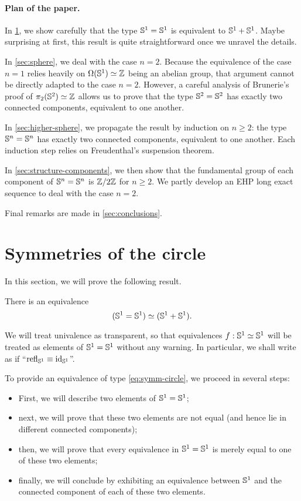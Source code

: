 \documentclass[english,a4paper]{lmcs}
\begin{document}
\paragraph{Plan of the paper.}
In \cref{sec:circle-case}, we show carefully that the type ${{\mathbb S^{1}}} = {{\mathbb S^{1}}}$
is equivalent to ${{\mathbb S^{1}}} + {{\mathbb S^{1}}}$. Maybe surprising at first, this result
is quite straightforward once we unravel the details.

In \cref{sec:sphere}, we deal with the case $n=2$. Because the
equivalence of the case $n=1$ relies heavily on $\Omega({{\mathbb S^{1}}})\simeq \mathbb{Z}$
being an abelian group, that argument cannot be directly adapted to the case
$n=2$. However, a careful analysis of Brunerie's proof of
$\pi_2({{\mathbb S^{2}}}) \simeq \mathbb{Z}$ \cite{TODO} allows us to prove that the type ${{\mathbb S^{2}}}={{\mathbb S^{2}}}$ has
exactly two connected components, equivalent to one another.

In \cref{sec:higher-sphere}, we propagate the result by induction on
$n\geq 2$: the type ${\mathbb S^{n}} = {\mathbb S^{n}}$ has exactly two connected
components, equivalent to one another. Each induction step relies on
Freudenthal's suspension theorem.


In \cref{sec:structure-components}, we then show that the fundamental group
of each component of ${\mathbb S^{n}} = {\mathbb S^{n}}$ is $\mathbb{Z}/2\mathbb{Z}$ for $n\ge2$.
We partly develop an EHP long exact sequence to deal with the case $n=2$.

Final remarks are made in \cref{sec:conclusions}.

\section{Symmetries of the circle}
\label{sec:circle-case}%

In this section, we will prove the following result.
\begin{thm}
  \label{thm:symmetries-of-S1}
  There is an equivalence
  \begin{equation}
    \label{eq:symm-circle}%
    (\Sc = \Sc) \weq (\Sc+\Sc).
  \end{equation}
\end{thm}
We will treat univalence as transparent, so that equivalences
$f:{{\mathbb S^{1}}}\simeq {{\mathbb S^{1}}}$ will be treated as elements of ${{\mathbb S^{1}}}={{\mathbb S^{1}}}$ without any
warning. In particular, we shall write as if
``$\mathop{{\mathrm{refl}}_{{{\mathbb S^{1}}}}} \equiv \mathord{\mathrm{id}}_{{\mathbb S^{1}}}$''.

To provide an equivalence of type \cref{eq:symm-circle}, we proceed
in several steps:
\begin{itemize}
\item First, we will describe two elements of ${{\mathbb S^{1}}}={{\mathbb S^{1}}}$;
\item next, we will prove that these two elements are not equal (and
hence lie in different connected components);
\item then, we will prove that every equivalence in ${{\mathbb S^{1}}}={{\mathbb S^{1}}}$ is
  merely equal to one of these two elements;
\item finally, we will conclude by exhibiting an equivalence between
  ${{\mathbb S^{1}}}$ and the connected component of each of these two elements.
\end{itemize}
\end{document}
